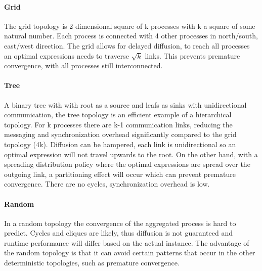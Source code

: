 \paragraph{Grid}
The grid topology is 2 dimensional square of k processes with k a square of some natural number. Each process is connected with 4 other processes in north/south, east/west direction. The grid allows for delayed diffusion, to reach all processes an optimal expressions needs to traverse $\sqrt{k}$ links. This prevents premature convergence, with all processes still interconnected.
\paragraph{Tree}
A binary tree with with root as a source and leafs as sinks with unidirectional communication, the tree topology is an efficient example of a hierarchical topology. For k processes there are k-1 communication links, reducing the messaging and synchronization overhead significantly compared to the grid topology (4k). Diffusion can be hampered, each link is unidirectional so an optimal expression will not travel upwards to the root. On the other hand, with a spreading distribution policy where the optimal expressions are spread over the outgoing link, a partitioning effect will occur which can prevent premature convergence. There are no cycles, synchronization overhead is low.
\paragraph{Random}
In a random topology the convergence of the aggregated process is hard to predict. Cycles and cliques are likely, thus diffusion is not guaranteed and runtime performance will differ based on the actual instance. The advantage of the random topology is that it can avoid certain patterns that occur in the other deterministic topologies, such as premature convergence.
